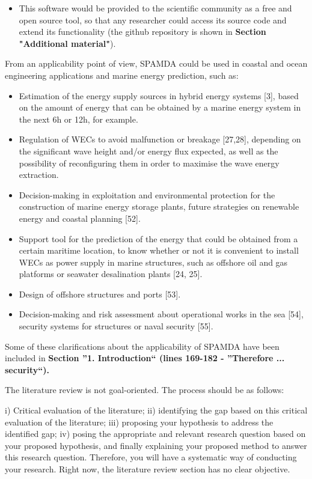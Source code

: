 \documentclass[a4paper,twoside,11pt]{article}
\newcounter{comments}[section]
\newcommand{\rcomment}[1]
{
	\stepcounter{comments}
	\vspace{0.6cm}
	\begin{tcolorbox}[colback=black!5,colframe=white!45!black,title=Comment \arabic{comments}]
		#1
	\end{tcolorbox}
}
\begin{document}
{\begin{itemize}
	\item This software would be provided to the scientific community as a free and open source tool, so that any researcher could access its source code and extend its functionality (the github repository is shown in \textbf{Section "Additional material"}).
\end{itemize}

From an applicability point of view, SPAMDA could be used in coastal and ocean engineering applications and marine energy prediction, such as:
\begin{itemize}
    \item Estimation of the energy supply sources in hybrid energy systems [3], based on the amount of energy that can be obtained by a marine energy system in the next 6h or 12h, for example.
    
    \item Regulation of WECs to avoid malfunction or breakage [27,28], depending on the significant wave height and/or energy flux expected, as well as the possibility of reconfiguring them in order to maximise the wave energy extraction.
        
    \item Decision-making in exploitation and environmental protection for the construction of marine energy storage plants, future strategies on renewable energy and coastal planning [52].
    
    \item Support tool for the prediction of the energy that could be obtained from a certain maritime location, to know whether or not it is convenient to install WECs as power supply in marine structures, such as offshore oil and gas platforms or seawater desalination plants [24, 25].
        
    \item Design of offshore structures and ports [53].
    
    \item Decision-making and risk assessment about operational works in the sea [54], security systems for structures or naval security [55].
\end{itemize}

Some of these clarifications about the applicability of SPAMDA have been included in \textbf{Section ''1. Introduction`` (lines 169-182 - ''Therefore ... security``).} 
}

\rcomment
{
The literature review is not goal-oriented. The process should be as follows:

\vspace{0.5cm}
i) Critical evaluation of the literature; ii) identifying the gap based on this critical evaluation of the literature; iii) proposing your hypothesis to address the identified gap; iv) posing the appropriate and relevant research question based on your proposed hypothesis, and finally explaining your proposed method to answer this research question. Therefore, you will have a systematic way of conducting your research. Right now, the literature review section has no clear objective.
}
\end{document}
